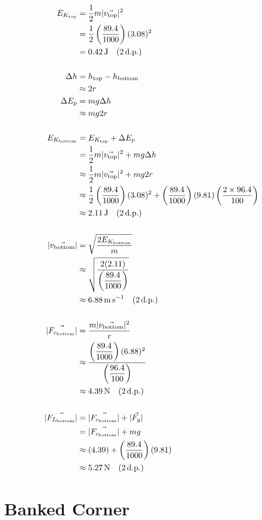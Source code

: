 \documentclass[11pt, a4paper]{article}
\begin{document}
	\begin{align}
		E_{K_{\text{top}}}&=\frac{1}{2}m|\vec{v_{\text{top}}}|^2\\
		&=\frac{1}{2}\left(\frac{89.4}{1000}\right)(3.08)^2\\
		&=\SI{0.42}{\joule} \quad (2\, \text{d.p.})\\[\baselineskip]
		\Delta h&=h_{\text{top}}-h_{\text{bottom}}\\
		&\approx2r\\
		\Delta E_p&=mg\Delta h\\
		&\approx mg2r\\[\baselineskip]
		E_{K_{\text{bottom}}}&=E_{K_{\text{top}}}+\Delta E_p\\
		&=\frac{1}{2}m|\vec{v_{\text{top}}}|^2+mg\Delta h\\
		&\approx \frac{1}{2}m|\vec{v_{\text{top}}}|^2+mg2r\\
		&\approx \frac{1}{2}\left(\frac{89.4}{1000}\right)(3.08)^2 + \left(\frac{89.4}{1000}\right)(9.81)\left(\frac{2\times96.4}{100}\right)\\
		&\approx \SI{2.11}{\joule} \quad (2\, \text{d.p.})\\[\baselineskip]
		|\vec{v_{\text{bottom}}}|&=\sqrt{\frac{2E_{K_{\text{bottom}}}}{m}}\\
		&\approx \sqrt{\frac{2(2.11)}{\left(\dfrac{89.4}{1000}\right)}}\\
		&\approx \SI{6.88}{\meter\per\second} \quad (2\, \text{d.p.})\\[\baselineskip]
		|\vec{F_{c_{\text{bottom}}}}|&=\frac{m|\vec{v_{\text{bottom}}}|^2}{r}\\
		&\approx\frac{\left(\dfrac{89.4}{1000}\right)(6.88)^2}{\left(\dfrac{96.4}{100}
			\right)}\\
		&\approx \SI{4.39}{\newton} \quad (2\, \text{d.p.})\\[\baselineskip]
		|\vec{F_{L_{\text{bottom}}}}|&=|\vec{F_{c_{\text{bottom}}}}|+|\vec{F_g}|\\
		&=|\vec{F_{c_{\text{bottom}}}}|+mg\\
		&\approx(4.39)+\left(\frac{89.4}{1000}\right)(9.81)\\
		&\approx \SI{5.27}{\newton} \quad (2\, \text{d.p.})
	\end{align}
	
	
	\section{Banked Corner}
\end{document}
